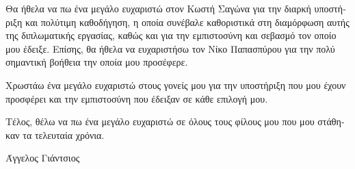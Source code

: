 \begin{greek}
\begin{acknowledgements}
Θα ήθελα να πω ένα μεγάλο ευχαριστώ στον Κωστή Σαγώνα για την διαρκή υποστήριξη
και πολύτιμη καθοδήγηση, η οποία συνέβαλε καθοριστικά στη διαμόρφωση αυτής της
διπλωματικής εργασίας, καθώς και για την εμπιστοσύνη και σεβασμό τον οποίο μου
έδειξε. Επίσης, θα ήθελα να ευχαριστήσω τον Νίκο Παπασπύρου για την πολύ
σημαντική βοήθεια την οποία μου προσέφερε.

Χρωστάω ένα μεγάλο ευχαριστώ στους γονείς μου για την υποστήριξη που μου έχουν
προσφέρει και την εμπιστοσύνη που έδειξαν σε κάθε επιλογή μου.

Τέλος, θέλω να πω ένα μεγάλο ευχαριστώ σε όλους τους φίλους μου που μου
στάθηκαν τα τελευταία χρόνια.
\begin{flushright}Άγγελος Γιάντσιος\end{flushright}

\end{acknowledgements}
\end{greek}
